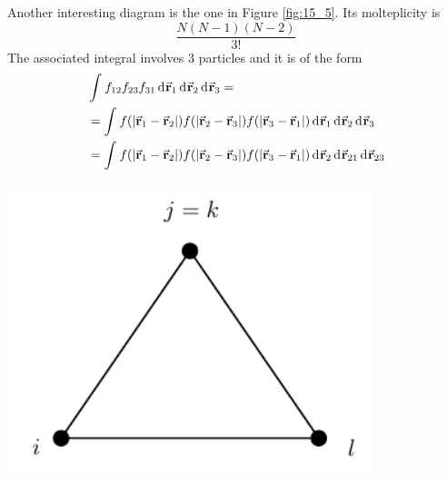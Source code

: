 \documentclass[../../Main/Main.tex]{subfiles}
\begin{document}
\begin{minipage}[c]{0.7\linewidth}
Another interesting diagram is the one in Figure \ref{fig:15_5}. Its molteplicity is
\begin{equation*}
  \frac{N(N-1)(N-2)}{3!}
\end{equation*}
The associated integral involves 3 particles and it is of the form
\begin{equation*}
\begin{split}
   & \int_{}^{} f_{12} f_{23} f_{31} \dd[]{\va{r}_1}  \dd[]{\va{r}_2} \dd[]{\va{r}_3} = \\
   & = \int_{}^{} f ( \abs{\va{r}_1 - \va{r}_2} ) f ( \abs{\va{r}_2 - \va{r}_3} )  f ( \abs{\va{r}_3 - \va{r}_1} )  \dd[]{\va{r}_1} \dd[]{\va{r}_2} \dd[]{\va{r}_3} \\
   & = \int_{}^{} f ( \abs{\va{r}_1 - \va{r}_2} ) f ( \abs{\va{r}_2 - \va{r}_3} )  f ( \abs{\va{r}_3 - \va{r}_1} )  \dd[]{\va{r}_2} \dd[]{\va{r}_{21}} \dd[]{\va{r}_{23}}
\end{split}
\end{equation*}
\end{minipage}
\begin{minipage}[]{0.3\linewidth}
\centering
\includegraphics[width=0.8\textwidth]{./img/8__1.pdf}
\end{minipage}
\end{document}
